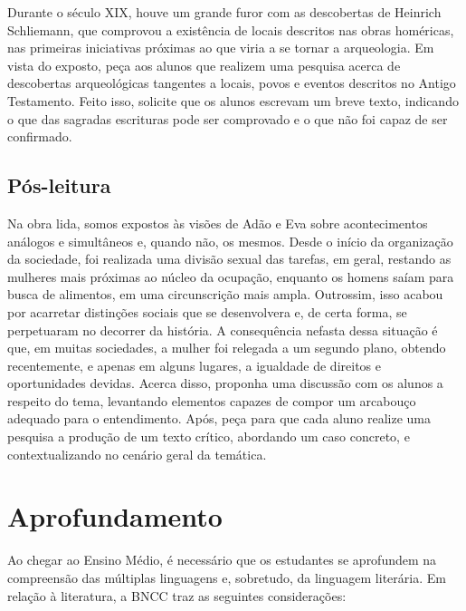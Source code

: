 \documentclass[12pt]{extarticle}
\begin{document}
Durante o século XIX, houve um grande furor com as descobertas de
Heinrich Schliemann, que comprovou a existência de locais descritos nas
obras homéricas, nas primeiras iniciativas próximas ao que viria a se
tornar a arqueologia. Em vista do exposto, peça aos alunos que realizem
uma pesquisa acerca de descobertas arqueológicas tangentes a locais,
povos e eventos descritos no Antigo Testamento. Feito isso, solicite que
os alunos escrevam um breve texto, indicando o que das sagradas
escrituras pode ser comprovado e o que não foi capaz de ser confirmado.


\subsection{Pós-leitura}

Na obra lida, somos expostos às visões de Adão e Eva sobre
acontecimentos análogos e simultâneos e, quando não, os mesmos. Desde o
início da organização da sociedade, foi realizada uma divisão sexual das
tarefas, em geral, restando as mulheres mais próximas ao núcleo da
ocupação, enquanto os homens saíam para busca de alimentos, em uma
circunscrição mais ampla. Outrossim, isso acabou por acarretar
distinções sociais que se desenvolvera e, de certa forma, se perpetuaram
no decorrer da história. A consequência nefasta dessa situação é que, em
muitas sociedades, a mulher foi relegada a um segundo plano, obtendo
recentemente, e apenas em alguns lugares, a igualdade de direitos e
oportunidades devidas. Acerca disso, proponha uma discussão com os
alunos a respeito do tema, levantando elementos capazes de compor um
arcabouço adequado para o entendimento. Após, peça para que cada aluno
realize uma pesquisa a produção de um texto crítico, abordando um caso
concreto, e contextualizando no cenário geral da temática.

\section{Aprofundamento}

Ao chegar ao Ensino Médio, é necessário que os estudantes se aprofundem
na compreensão das múltiplas linguagens e, sobretudo, da linguagem
literária. Em relação à literatura, a BNCC traz as seguintes
considerações:
\end{document}
